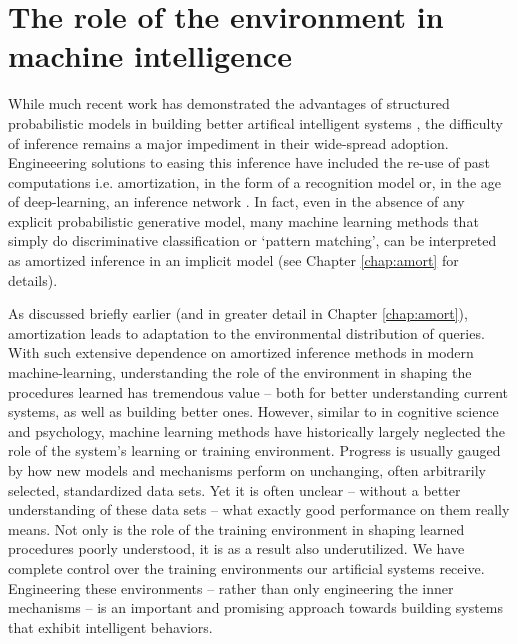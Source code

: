 
\section*{The role of the environment in machine intelligence}

While much recent work has demonstrated the advantages of structured probabilistic models in building better artifical intelligent systems \cite{lake2015human, del2013understanding, zhao2011image, steyvers2007probabilistic}, the difficulty of inference remains a major impediment in their wide-spread adoption. Engineeering solutions to easing this inference have included the re-use of past computations i.e. amortization, in the form of a recognition model\cite{dayan1995helmholtz, kingma2014auto} or, in the age of deep-learning, an inference network \citep{kulkarni2015picture, mnih2014neural, rezende2015variational, paige2016inference}. In fact, even in the absence of any explicit probabilistic generative model, many machine learning methods that simply do discriminative classification or `pattern matching', can be interpreted as amortized inference in an implicit model (see Chapter \ref{chap:amort} for details). 

As discussed briefly earlier (and in greater detail in Chapter \ref{chap:amort}), amortization leads to adaptation to the environmental distribution of queries. With such extensive dependence on amortized inference methods in modern machine-learning, understanding the role of the environment in shaping the procedures learned has tremendous value -- both for better understanding current systems, as well as building better ones. However, similar to in cognitive science and psychology, machine learning methods have historically largely neglected the role of the system's learning or training environment. Progress is usually gauged by how new models and mechanisms perform on unchanging, often arbitrarily selected, standardized data sets. Yet it is often unclear -- without a better understanding of these data sets -- what exactly good performance on them really means. Not only is the role of the training environment in shaping learned procedures poorly understood, it is as a result also underutilized. We have complete control over the training environments our artificial systems receive. Engineering these environments -- rather than only engineering the inner mechanisms -- is an important and promising approach towards building systems that exhibit intelligent behaviors.

